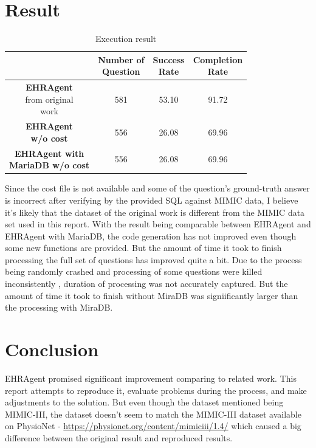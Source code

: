 \documentclass[screen,review]{acmart}
\begin{document}
\section{Result}
\begin{table}[H]
  \centering
  \caption{Execution result}
  \label{tab:result}
  \centering
  \begin{tabular}{|c|c|c|c|}
      \hline
       & \makecell{\textbf{Number of} \\ \textbf{Question}} & \makecell{\textbf{Success} \\ \textbf{Rate}} & \makecell{\textbf{Completion} \\ \textbf{Rate}}  \\
      \hline
      \makecell{\textbf{EHRAgent} \\ from original \\ work\cite{shi2024ehragent} } & 581 & 53.10 & 91.72\\
      \hline
      \makecell{\textbf{EHRAgent} \\ \textbf{w/o cost}} & 556 & 26.08 & 69.96\\ 
      \hline
      \makecell{\textbf{EHRAgent with} \\ \textbf{MariaDB w/o cost}} & 556 & 26.08 & 69.96\\
      \hline
  \end{tabular}
\end{table}
Since the cost file is not available and some of the question's ground-truth answer is incorrect after verifying by the provided SQL 
against MIMIC data, I believe it's likely that the dataset of the original work\cite{shi2024ehragent} is different from the MIMIC 
data set used in this report. With the result being comparable between EHRAgent and EHRAgent with MariaDB, the code generation 
has not improved even though some new functions are provided. But the amount of time it took to finish processing the full set of 
questions has improved quite a bit. Due to the process being randomly crashed and processing of some questions were killed inconsistently
, duration of processing was not accurately captured. But the amount of time it took to finish without MiraDB was signiificantly larger
than the processing with MiraDB. 

\section{Conclusion}
EHRAgent\cite{shi2024ehragent} promised significant improvement comparing to related work. This report attempts to reproduce it, 
evaluate problems during the process, and make adjustments to the solution. But even though the dataset 
mentioned being MIMIC-III, the dataset doesn't seem to match the MIMIC-III dataset available on PhysioNet - 
\url{https://physionet.org/content/mimiciii/1.4/} which caused a big difference between the original result and reproduced results. 
\end{document}
